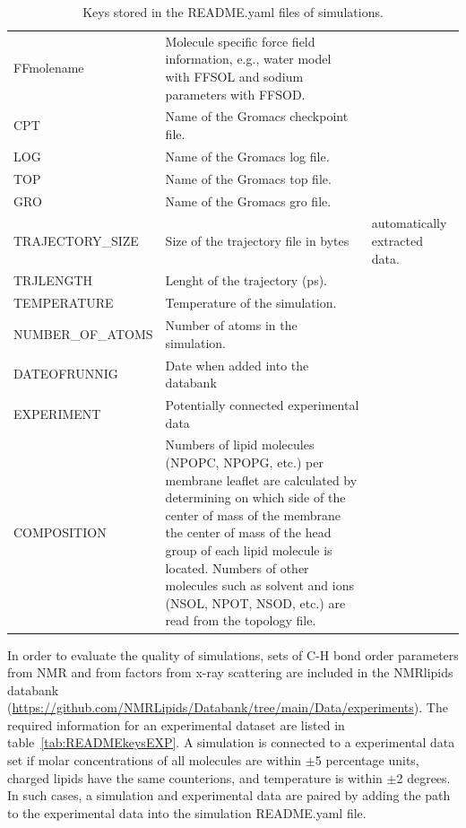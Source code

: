 \documentclass[fleqn,10pt]{wlscirep}
\begin{document}
\begin{table}[]
\begin{tabular}{  p{3.5cm}  p{9.5cm}  p{4.0cm} }
    FF{molename} & Molecule specific force field information, e.g., water model with FFSOL and sodium parameters with FFSOD. & \\
    CPT & Name of the Gromacs checkpoint file. & \\
    LOG & Name of the Gromacs log file. & \\
    TOP & Name of the Gromacs top file. & \\
    GRO & Name of the Gromacs gro file. & \\
    \hline
    TRAJECTORY\_SIZE & Size of the trajectory file in bytes & automatically extracted data. \\
    TRJLENGTH & Lenght of the trajectory (ps). & \\
    TEMPERATURE & Temperature of the simulation. & \\
    NUMBER\_OF\_ATOMS & Number of atoms in the simulation. & \\
    DATEOFRUNNIG & Date when added into the databank & \\
    EXPERIMENT & Potentially connected experimental data & \\
    COMPOSITION & Numbers of lipid molecules (NPOPC, NPOPG, etc.) per membrane leaflet are calculated by determining on which side of the center of mass of the membrane the center of mass of the head group of each lipid molecule is located.
    Numbers of other molecules such as solvent and ions (NSOL, NPOT, NSOD, etc.) are read from the topology file. & \\
    \end{tabular}
    \caption{Keys stored in the README.yaml files of simulations.}
    \label{tab:READMEkeys}
\end{table}

In order to evaluate the quality of simulations, sets of C-H bond order parameters from NMR and from factors from x-ray scattering are included in the NMRlipids databank (\url{https://github.com/NMRLipids/Databank/tree/main/Data/experiments}). The required information for an experimental dataset are listed in table~\ref{tab:READMEkeysEXP}.
A simulation is connected to a experimental data set
if molar concentrations of all molecules are within $\pm$5 percentage units, charged lipids have the same counterions, and temperature is within $\pm$2 degrees. In such cases, a simulation and experimental data are paired by adding the path to the experimental data into the simulation README.yaml file. 
\end{document}
